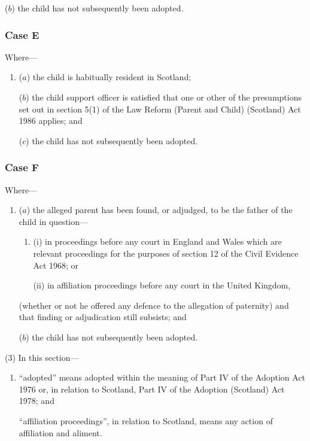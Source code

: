\documentclass[12pt,a4paper]{article}
\begin{document}
\begin{enumerate}
\begin{enumerate}
    ($b$) 
    the child has not subsequently been adopted.
\end{enumerate}

    \subsubsection*{Case E}

    Where—
\begin{enumerate}\item[]
    ($a$) 
    the child is habitually resident in Scotland;

    ($b$) 
    the child support officer is satisfied that one or other of the presumptions set out in section 5(1)  of the Law Reform (Parent and Child) (Scotland) Act 1986 applies; and

    ($c$) 
    the child has not subsequently been adopted.
\end{enumerate}

    \subsubsection*{Case F}

    Where—
\begin{enumerate}\item[]
    ($a$) 
    the alleged parent has been found, or adjudged, to be the father of the child in question—
\begin{enumerate}\item[]
    (i) 
    in proceedings before any court in England and Wales which are relevant proceedings for the purposes of section 12 of the Civil Evidence Act 1968; or

    (ii) 
    in affiliation proceedings before any court in the United Kingdom,
\end{enumerate}

    (whether or not he offered any defence to the allegation of paternity) and that finding or adjudication still subsists; and

    ($b$) 
    the child has not subsequently been adopted. 
\end{enumerate}
\end{enumerate}

(3) In this section—
\begin{enumerate}\item[]
    “adopted” means adopted within the meaning of Part IV of the Adoption Act 1976 or, in relation to Scotland, Part IV of the Adoption (Scotland) Act 1978; and

    “affiliation proceedings”, in relation to Scotland, means any action of affiliation and aliment. 
\end{enumerate}
\end{document}
